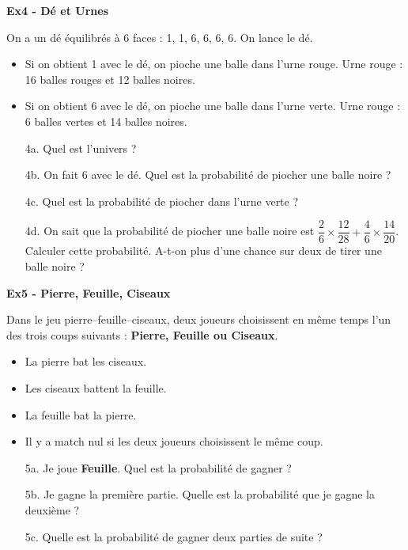 \textbf{Ex4 - Dé et Urnes}

On a un dé équilibrés à 6 faces : 1, 1, 6, 6, 6, 6. On lance le dé. 

\begin{multicols}{2}\noindent
\begin{itemize}[label={$\bullet$}]
  \item Si on obtient 1 avec le dé, on pioche une balle dans l'urne rouge.
  Urne rouge : 16 balles rouges et 12 balles noires.

  \item Si on obtient 6 avec le dé, on pioche une balle dans l'urne verte.
  Urne rouge : 6 balles vertes et 14 balles noires.
\end{itemize}
\end{multicols}

\begin{enumerate}
  \item[4a.] Quel est l'univers ? \\ \Pointilles[2] 
  \item[4b.] On fait 6 avec le dé. Quel est la probabilité de piocher une balle noire ? \\ \Pointilles[2] 
  \item[4c.] Quel est la probabilité de piocher dans l'urne verte ? \\ \Pointilles[2] 
  \item[4d.] On sait que la probabilité de piocher une balle noire est $\dfrac{2}{6} \times \dfrac{12}{28} + \dfrac{4}{6} \times \dfrac{14}{20}$. \\
  Calculer cette probabilité. A-t-on plus d'une chance sur deux de tirer une balle noire ? \\ \Pointilles[3] 
\end{enumerate}

\textbf{Ex5 - Pierre, Feuille, Ciseaux}

Dans le jeu pierre–feuille–ciseaux, deux joueurs choisissent en même temps l’un des trois coups suivants : \textbf{Pierre, Feuille ou Ciseaux}.

\begin{itemize}[label={$\bullet$}]
  \item La pierre bat les ciseaux.
  \item Les ciseaux battent la feuille. 
  \item La feuille bat la pierre.
  \item Il y a match nul si les deux joueurs choisissent le même coup.
\end{itemize}

\begin{enumerate}
  \item[5a.] Je joue \textbf{Feuille}. Quel est la probabilité de gagner ? \\ \Pointilles[2] 
  \item[5b.] Je gagne la première partie. Quelle est la probabilité que je gagne la deuxième ? \\ \Pointilles[4] 
  \item[5c.] Quelle est la probabilité de gagner deux parties de suite ? \\ \Pointilles[4] 
\end{enumerate}

